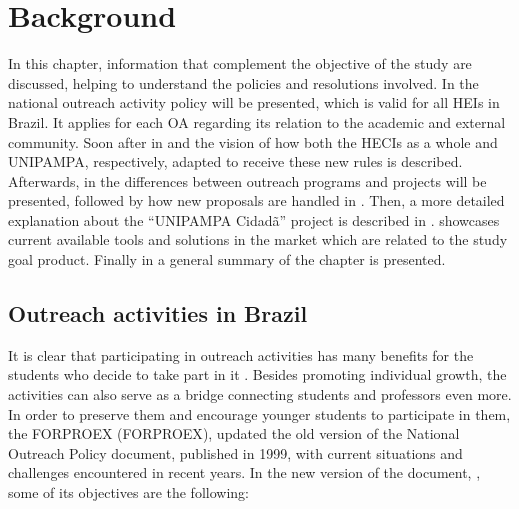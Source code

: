 \chapter{Background}\label{background}

In this chapter, information that complement the objective of the study are discussed, helping to understand the policies and resolutions involved. In  the national outreach activity policy will be presented, which is valid for all \acp{HEI} in Brazil. It applies for each \ac{OA} regarding its relation to the academic and external community. Soon after in  and  the vision of how both the \acp{HECI} as a whole and \acl{UNIPAMPA}, respectively, adapted to receive these new rules is described. Afterwards, in  the differences between outreach programs and projects will be presented, followed by how new proposals are handled in . Then, a more detailed explanation about the ``\ac{UNIPAMPA} Cidadã'' project is described in .  showcases current available tools and solutions in the market which are related to the study goal product. Finally in  a general summary of the chapter is presented.

\section{Outreach activities in Brazil}\label{sec:bac-outreach-brazil}

It is clear that participating in outreach activities has many benefits for the students who decide to take part in it \cite{sellou2011many}. Besides promoting individual growth, the activities can also serve as a bridge connecting students and professors even more. In order to preserve them and encourage younger students to participate in them, the \acl{FORPROEX} (\ac{FORPROEX}), updated the old version of the National Outreach Policy document, published in 1999, with current situations and challenges encountered in recent years. In the new version of the document, \cite{politicaNacional}, some of its objectives are the following:

